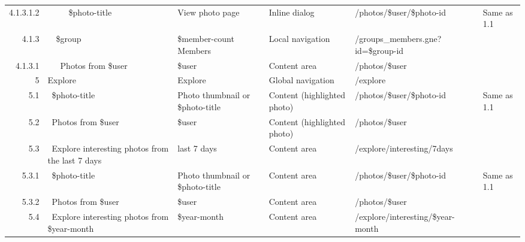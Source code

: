 \documentclass[12pt,a4paper]{article}
\begin{document}
\begin{landscape}
\begin{table}[h!b!p!]
\begin{center}
\begin{tiny}
\begin{tabular}{r|l|l|l|l|p{3cm}}
                    4.1.3.1.2 &
                    ~~~~~\$photo-title &
                    View photo page &
                    Inline dialog &
                    /photos/\$user/\$photo-id &
                    Same as 1.1 \\

                4.1.3 &
                ~~\$group  &
                \$member-count Members &
                Local navigation &
                /groups\_members.gne?id=\$group-id &
                \\

                  4.1.3.1 &
                  ~~~Photos from \$user &
                  \$user &
                  Content area &
                  /photos/\$user &
                  \\


            5 &
            Explore &
            Explore &
            Global navigation &
            /explore &
            \\

              5.1 &
              ~\$photo-title &
              Photo thumbnail or \$photo-title &
              Content (highlighted photo) &
              /photos/\$user/\$photo-id &
              Same as 1.1 \\

              5.2 &
              ~Photos from \$user &
              \$user &
              Content (highlighted photo) &
              /photos/\$user &
              \\

              5.3 &
              ~Explore interesting photos from the last 7 days &
              last 7 days &
              Content area &
              /explore/interesting/7days &
              \\

                5.3.1 &
                ~\$photo-title &
                Photo thumbnail or \$photo-title &
                Content area &
                /photos/\$user/\$photo-id &
                Same as 1.1 \\

                5.3.2 &
                ~Photos from \$user &
                \$user &
                Content area &
                /photos/\$user &
                \\

              5.4 &
              ~Explore interesting photos from \$year-month &
              \$year-month &
              Content area &
              /explore/interesting/\$year-month &
              \\


\end{tabular}
\end{tiny}
\end{center}
\end{table}
\end{landscape}
\end{document}
